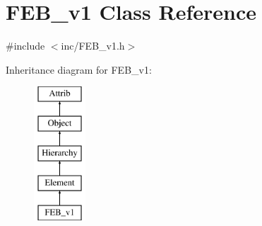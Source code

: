 \hypertarget{classFEB__v1}{}\section{F\+E\+B\+\_\+v1 Class Reference}
\label{classFEB__v1}


{\ttfamily \#include $<$inc/\+F\+E\+B\+\_\+v1.\+h$>$}

Inheritance diagram for F\+E\+B\+\_\+v1\+:\begin{figure}[H]
\begin{center}
\leavevmode
\includegraphics[height=5.000000cm]{classFEB__v1}
\end{center}
\end{figure}

